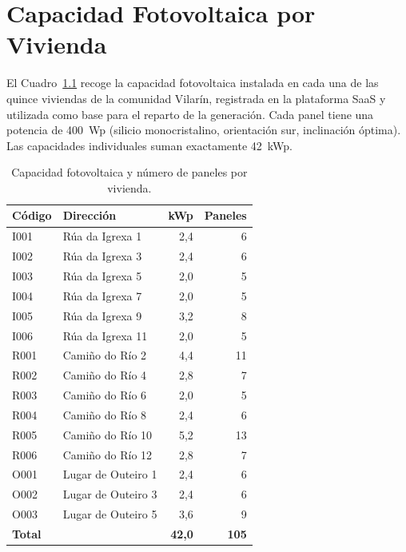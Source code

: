\documentclass[12pt, a4paper, twoside]{report}
\begin{document}
\printbibliography[heading=bibintoc]

\appendix

\chapter{Capacidad Fotovoltaica por Vivienda}
\label{app:capacidad}

El Cuadro~\ref{tab:capacidad} recoge la capacidad fotovoltaica instalada en cada
una de las quince viviendas de la comunidad Vilarín, registrada en la plataforma
SaaS y utilizada como base para el reparto de la generación. Cada panel tiene
una potencia de \SI{400}{Wp} (silicio monocristalino, orientación sur,
inclinación óptima). Las capacidades individuales suman exactamente \SI{42}{kWp}.

\begin{table}[H]
\centering
\caption{Capacidad fotovoltaica y número de paneles por vivienda.}
\label{tab:capacidad}
\begin{tabular}{llrr}
\toprule
\textbf{Código} & \textbf{Dirección} & \textbf{kWp} & \textbf{Paneles} \\
\midrule
I001 & Rúa da Igrexa 1 & 2{,}4 & 6 \\
I002 & Rúa da Igrexa 3 & 2{,}4 & 6 \\
I003 & Rúa da Igrexa 5 & 2{,}0 & 5 \\
I004 & Rúa da Igrexa 7 & 2{,}0 & 5 \\
I005 & Rúa da Igrexa 9 & 3{,}2 & 8 \\
I006 & Rúa da Igrexa 11 & 2{,}0 & 5 \\
R001 & Camiño do Río 2 & 4{,}4 & 11 \\
R002 & Camiño do Río 4 & 2{,}8 & 7 \\
R003 & Camiño do Río 6 & 2{,}0 & 5 \\
R004 & Camiño do Río 8 & 2{,}4 & 6 \\
R005 & Camiño do Río 10 & 5{,}2 & 13 \\
R006 & Camiño do Río 12 & 2{,}8 & 7 \\
O001 & Lugar de Outeiro 1 & 2{,}4 & 6 \\
O002 & Lugar de Outeiro 3 & 2{,}4 & 6 \\
O003 & Lugar de Outeiro 5 & 3{,}6 & 9 \\
\midrule
\textbf{Total} & & \textbf{42{,}0} & \textbf{105} \\
\bottomrule
\end{tabular}
\end{table}
\end{document}
